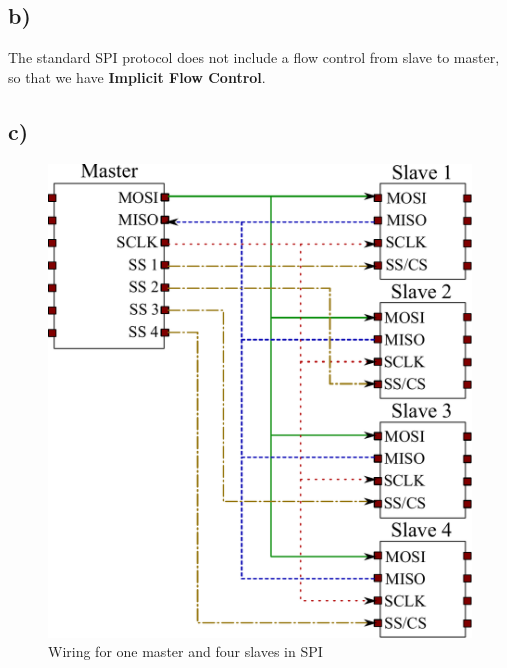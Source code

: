 \documentclass[12pt]{article}
\begin{document}
\subsection*{b)}
The standard SPI protocol does not include a flow control from slave to master, so that we have \textbf{Implicit Flow Control}.

\subsection*{c)}
\begin{figure}[h]
			\centering
			\includegraphics[scale = 0.5]{figures/SPI_drawing}
			\caption{Wiring for one master and four slaves in SPI}
\end{figure}
\end{document}
